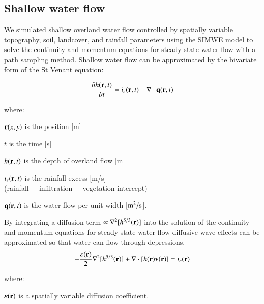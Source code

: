 \documentclass[final,3p,times,twocolumn]{elsarticle}
\begin{document}
\subsection{Shallow water flow}

We simulated shallow overland water flow controlled by spatially variable topography, soil, landcover, and rainfall parameters using the SIMWE model to solve the continuity and momentum equations for steady state water flow with a path sampling method. 
%
Shallow water flow can be approximated by
the bivariate form of the St Venant equation:

\begin{equation}
\label{eq:water}
{\partial h({\bf r},t) \over \partial t} =
 i_e({\bf r},t) - \nabla \cdot {\bf q}({\bf r},t)
\end{equation}

where:

\hspace*{1em} ${\bf r}(x,y)$ is the position [m]

\hspace*{1em} $t$ is the time [s]

\hspace*{1em} $h({\bf r},t)$ is the depth of overland flow [m]

\hspace*{1em} $i_e({\bf r},t)$ is the rainfall excess [m/s]\\
\hspace*{1em} (rainfall $-$ infiltration $-$ vegetation intercept) 

\hspace*{1em} ${\bf q}({\bf r},t)$ is the water flow per unit width [$\rm m^2/s$].

By integrating a diffusion term $ \propto \nabla^2 [h^{5/3}({\bf r})]$ 
into
the solution of the continuity and momentum equations for steady state water flow
diffusive wave effects can be approximated
so that water can flow through depressions. 
%
\begin{equation}
\label{eq:difwater}
-{\varepsilon({\bf r})\over 2 }\nabla^2 [h^{5/3}({\bf r})]
+\nabla \cdot [ h({\bf r}){\bf v}({\bf r})] = i_e({\bf r})
\end{equation}

 where:
 
 \hspace*{1em} $\varepsilon({\bf r})$ is a spatially variable diffusion coefficient.
\end{document}
